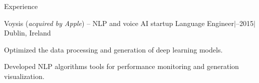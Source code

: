 \documentclass{resume} %
\begin{document}
\begin{rSection}{Experience}
%	
%	

\begin{rSubsection}
	{Voysis (\textit{acquired by Apple}) -- {\small NLP and voice AI startup}}
	{}
	{Language Engineer\quad$\vert$--2015\quad$\vert$\quad Dublin, Ireland}
	{}
	
	\setlength{\itemindent}{.5cm}

	\item Optimized the data processing and generation of deep learning models.
	\item Developed NLP algorithms tools for performance monitoring and generation visualization.
\end{rSubsection}

%	
%	

%	
%	

%	
%	
%


\end{rSection}
\end{document}
